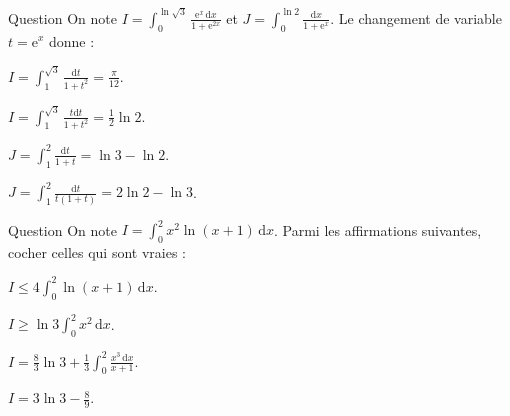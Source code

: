 \begin{multi}[multiple,feedback=
{Avec \(t=\mathrm{e}^x\Rightarrow \mathrm{d}t=\mathrm{e}^x\, \mathrm{d}x\), on a : \(\displaystyle I=\int _1^{\sqrt{3}}\frac{\mathrm{d}t}{1+t^2}=\Big[\arctan t\Big]_1^{\sqrt{3}}=\frac{\pi}{12}\).
\vskip0mm
Avec \(t=\mathrm{e}^x\Rightarrow \mathrm{d}t=\mathrm{e}^x\, \mathrm{d}x\), on a : \(\displaystyle J=\int _1^{2}\frac{\mathrm{d}t}{t(1+t)}=\left[\ln \frac{t}{1+t}\right]_1^{2}=2\ln 2-\ln 3\).
}]{Question}
On note \(\displaystyle I=\int _{0}^{\ln \sqrt{3}}\frac{\mathrm{e}^x\, \mathrm{d}x}{1+\mathrm{e}^{2x}}\) et \(\displaystyle J=\int _{0}^{\ln 2}\frac{\mathrm{d}x}{1+\mathrm{e}^{x}}\). Le changement de variable \(t=\mathrm{e}^x\) donne :

    \item* \(\displaystyle I=\int _1^{\sqrt{3}}\frac{\mathrm{d}t}{1+t^2}=\frac{\pi}{12}\).
    \item \(\displaystyle I=\int _1^{\sqrt{3}}\frac{t\mathrm{d}t}{1+t^2}=\frac{1}{2}\ln 2\).
    \item \(\displaystyle J=\int _1^{2}\frac{\mathrm{d}t}{1+t}=\ln 3-\ln 2\).
    \item* \(\displaystyle J=\int _1^{2}\frac{\mathrm{d}t}{t(1+t)}=2\ln 2-\ln 3\).
\end{multi}


\begin{multi}{Question}
On note \(\displaystyle I=\int _{0}^{2}x^2\ln (x+1)\, \mathrm{d}x\). Parmi les affirmations suivantes, cocher celles qui sont vraies :

    \item* \(\displaystyle I\leq 4\int _{0}^{2}\ln (x+1)\, \mathrm{d}x\).
    \item \(\displaystyle I\geq \ln 3\int _{0}^{2}x^2\, \mathrm{d}x\).
    \item \(\displaystyle I=\frac{8}{3}\ln 3+\frac{1}{3}\int _{0}^{2}\frac{x^3\, \mathrm{d}x}{x+1}\).
    \item* \(\displaystyle I=3\ln 3-\frac{8}{9}\).
\end{multi}


